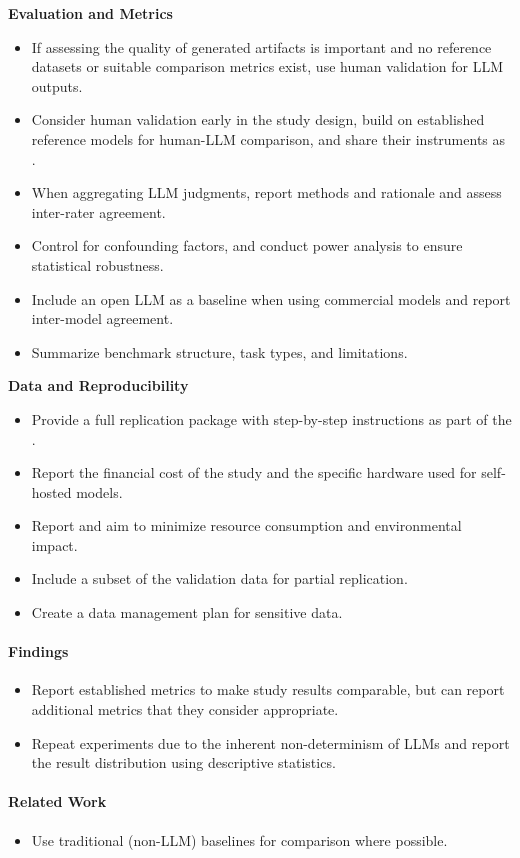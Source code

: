 \textbf{Evaluation and Metrics}
\begin{itemize}[label=$\square$]
    \item If assessing the quality of generated artifacts is important and no reference datasets or suitable comparison metrics exist, use human validation for LLM outputs.
    \item Consider human validation early in the study design, build on established reference models for human-LLM comparison, and share their instruments as \supplementarymaterial.
    \item When aggregating LLM judgments, report methods and rationale and assess inter-rater agreement.
    \item Control for confounding factors, and conduct power analysis to ensure statistical robustness.
    \item Include an open LLM as a baseline when using commercial models and report inter-model agreement.
    \item Summarize benchmark structure, task types, and limitations.
\end{itemize}

\textbf{Data and Reproducibility}
\begin{itemize}[label=$\square$]
    \item Provide a full replication package with step-by-step instructions as part of the \supplementarymaterial.
    \item Report the financial cost of the study and the specific hardware used for self-hosted models.
    \item Report and aim to minimize resource consumption and environmental impact.
    \item Include a subset of the validation data for partial replication.
    \item Create a data management plan for sensitive data.
\end{itemize}

\paragraph{Findings}
\begin{itemize}[label=$\square$]
    \item Report established metrics to make study results comparable, but can report additional metrics that they consider appropriate.
    \item Repeat experiments due to the inherent non-determinism of LLMs and report the result distribution using descriptive statistics.
\end{itemize}

\paragraph{Related Work}
\begin{itemize}[label=$\square$]
    \item Use traditional (non-LLM) baselines for comparison where possible.
\end{itemize}
